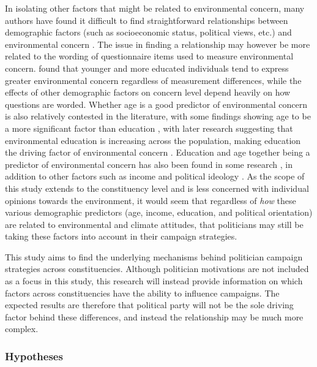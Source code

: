 \documentclass[preprint,12pt,authoryear]{elsarticle}
\begin{document}
In isolating other factors that might be related to environmental concern, many authors have found it difficult to find straightforward relationships between demographic factors (such as socioeconomic status, political views, etc.) and environmental concern \citep{dietzSocialStructuralSocial1998,samdahlSocialDeterminantsEnvironmental1989,giffordPersonalSocialFactors2014}. The issue in finding a relationship may however be more related to the wording of questionnaire items used to measure environmental concern. \citet{klinebergDemographicPredictorsEnvironmental1998} found that younger and more educated individuals tend to express greater environmental concern regardless of measurement differences, while the effects of other demographic factors on concern level depend heavily on how questions are worded. Whether age is a good predictor of environmental concern is also relatively contested in the literature, with some findings showing age to be a more significant factor than education \citep{buttelAgeEnvironmentalConcern1979}, with later research suggesting that environmental education is increasing across the population, making education the driving factor of environmental concern \citep{howellChangingFaceEnvironmental1992}. Education and age together being a predictor of environmental concern has also been found in some research \citep{arcuryEnvironmentalWorldviewResponse1990}, in addition to other factors such as income \citep{gambaFactorsInfluencingCommunity1994} and political ideology \citep{dunlapImpactPoliticalOrientation1975}. As the scope of this study extends to the constituency level and is less concerned with individual opinions towards the environment, it would seem that regardless of \textit{how} these various demographic predictors (age, income, education, and political orientation) are related to environmental and climate attitudes, that politicians may still be taking these factors into account in their campaign strategies.

This study aims to find the underlying mechanisms behind politician campaign strategies across constituencies. Although politician motivations are not included as a focus in this study, this research will instead provide information on which factors across constituencies have the ability to influence campaigns. The expected results are therefore that political party will not be the sole driving factor behind these differences, and instead the relationship may be much more complex. 
	

\subsubsection{Hypotheses}
\end{document}
